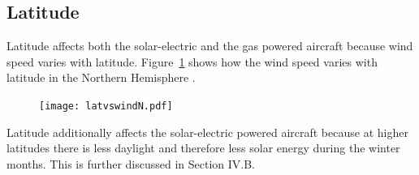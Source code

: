 \DIFdelend \subsection{Latitude}

\DIFaddbegin {}\DIFaddend Latitude affects both the solar-electric and the gas powered aircraft because wind speed varies with latitude. 
Figure~\ref{f:latvswind} shows how the wind speed varies with latitude in the Northern Hemisphere \DIFaddbegin {}\DIFaddend . 

\begin{figure}[H]
	\begin{center}
	\DIFdelbeginFL %
\DIFdelendFL \DIFaddbeginFL \texttt{[image: latvswindN.pdf]}
    \DIFaddendFL \caption{\DIFdelbeginFL \textbf{}%
\DIFdelendFL \DIFaddbeginFL \textbf{}\DIFaddendFL }
	\label{f:latvswind}
	\end{center}
\end{figure}

Latitude additionally affects the solar-electric powered aircraft because at higher latitudes there is less daylight and therefore less solar energy during the winter months. This is further discussed in Section IV.B.

